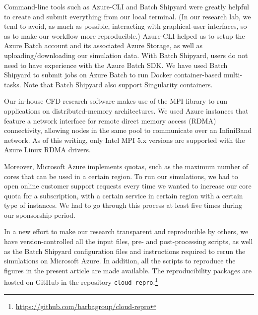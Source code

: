 \documentclass[10pt,journal,compsoc]{IEEEtran}
\begin{document}
Command-line tools such as Azure-CLI and Batch Shipyard were greatly helpful to create and submit everything from our local terminal. (In our research lab, we tend to avoid, as much as possible, interacting with graphical-user interfaces, so as to make our workflow more reproducible.)
Azure-CLI helped us to setup the Azure Batch account and its associated Azure Storage, as well as uploading/downloading our simulation data.
With Batch Shipyard, users do not need to have experience with the Azure Batch SDK.
We have used Batch Shipyard to submit jobs on Azure Batch to run Docker container-based multi-tasks.
Note that Batch Shipyard also support Singularity containers.

Our in-house CFD research software makes use of the MPI library to run applications on distributed-memory architectures.
We used Azure instances that feature a network interface for remote direct memory access (RDMA) connectivity, allowing nodes in the same pool to communicate over an InfiniBand network.
As of this writing, only Intel MPI 5.x versions are supported with the Azure Linux RDMA drivers.

Moreover, Microsoft Azure implements quotas, such as the maximum number of cores that can be used in a certain region.
To run our simulations, we had to open online customer support requests every time we wanted to increase our core quota for a subscription, with a certain service in certain region with a certain type of instances.
We had to go through this process at least five times during our sponsorship period.

In a new effort to make our research transparent and reproducible by others, we have version-controlled all the input files, pre- and post-processing scripts, as well as the Batch Shipyard configuration files and instructions required to rerun the simulations on Microsoft Azure.
In addition, all the scripts to reproduce the figures in the present article are made available.
The reproducibility packages are hosted on GitHub in the repository \texttt{cloud-repro}.\footnote{\url{https://github.com/barbagroup/cloud-repro}}




%
\end{document}

